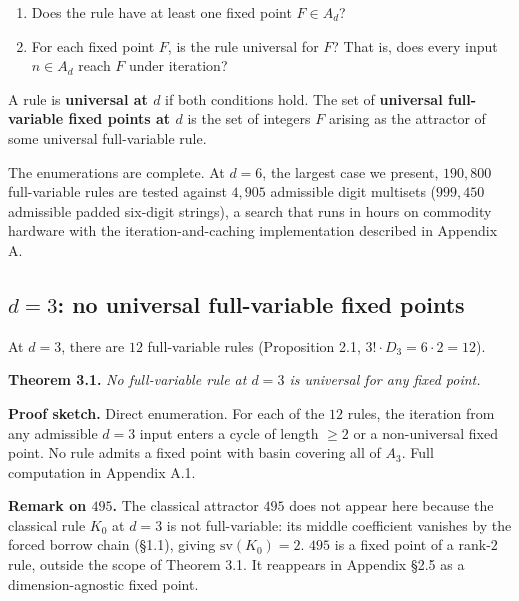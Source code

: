 \documentclass[11pt,letterpaper]{article}
\providecommand{\tightlist}{%
  \setlength{\itemsep}{0pt}\setlength{\parskip}{0pt}}
\theoremstyle{paperstyle}
\theoremstyle{paperstyledef}
\theoremstyle{paperstylerem}
\begin{document}
\begin{enumerate}
\def\labelenumi{\arabic{enumi}.}
\tightlist
\item
  Does the rule have at least one fixed point \(F \in A_d\)?
\item
  For each fixed point \(F\), is the rule universal for \(F\)? That is,
  does every input \(n \in A_d\) reach \(F\) under iteration?
\end{enumerate}

A rule is \textbf{universal at \(d\)} if both conditions hold. The set
of \textbf{universal full-variable fixed points at \(d\)} is the set of
integers \(F\) arising as the attractor of some universal full-variable
rule.

The enumerations are complete. At \(d = 6\), the largest case we
present, \(190{,}800\) full-variable rules are tested against
\(4{,}905\) admissible digit multisets (\(999{,}450\) admissible padded
six-digit strings), a search that runs in hours on commodity hardware
with the iteration-and-caching implementation described in Appendix A.

\hypertarget{d-3-no-universal-full-variable-fixed-points}{%
\subsection{\texorpdfstring{\(d = 3\): no universal full-variable fixed points}{d = 3: no universal full-variable fixed points}}\label{d-3-no-universal-full-variable-fixed-points}}

At \(d = 3\), there are \(12\) full-variable rules (Proposition 2.1,
\(3! \cdot D_3 = 6 \cdot 2 = 12\)).

\textbf{Theorem 3.1.} \emph{No full-variable rule at \(d = 3\) is
universal for any fixed point.}

\textbf{Proof sketch.} Direct enumeration. For each of the \(12\) rules,
the iteration from any admissible \(d = 3\) input enters a cycle of
length \(\geq 2\) or a non-universal fixed point. No rule admits a fixed
point with basin covering all of \(A_3\). Full computation in Appendix
A.1.

\textbf{Remark on \(495\).} The classical attractor \(495\) does not
appear here because the classical rule \(K_0\) at \(d = 3\) is not
full-variable: its middle coefficient vanishes by the forced borrow
chain (§1.1), giving \(\mathrm{sv}(K_0) = 2\). \(495\) is a fixed point
of a rank-\(2\) rule, outside the scope of Theorem 3.1. It reappears in
Appendix §2.5 as a dimension-agnostic fixed point.
\end{document}
